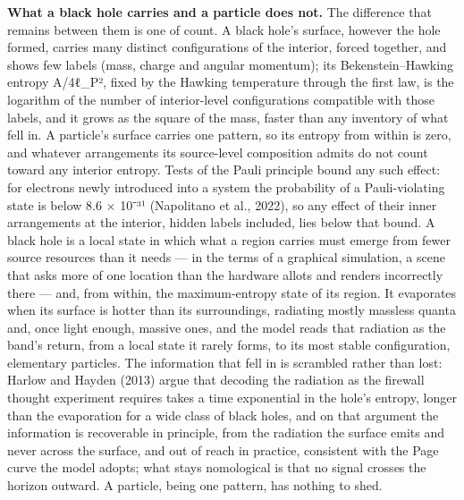 \documentclass[
]{article}
\begin{document}
\textbf{What a black hole carries and a particle does not.} The
difference that remains between them is one of count. A black hole's
surface, however the hole formed, carries many distinct configurations
of the interior, forced together, and shows few labels (mass, charge and
angular momentum); its Bekenstein--Hawking entropy A/4ℓ\_P², fixed by
the Hawking temperature through the first law, is the logarithm of the
number of interior-level configurations compatible with those labels,
and it grows as the square of the mass, faster than any inventory of
what fell in. A particle's surface carries one pattern, so its entropy
from within is zero, and whatever arrangements its source-level
composition admits do not count toward any interior entropy. Tests of
the Pauli principle bound any such effect: for electrons newly
introduced into a system the probability of a Pauli-violating state is
below 8.6 × 10⁻³¹ (Napolitano et al., 2022), so any effect of their
inner arrangements at the interior, hidden labels included, lies below
that bound. A black hole is a local state in which what a region carries
must emerge from fewer source resources than it needs --- in the terms
of a graphical simulation, a scene that asks more of one location than
the hardware allots and renders incorrectly there --- and, from within,
the maximum-entropy state of its region. It evaporates when its surface
is hotter than its surroundings, radiating mostly massless quanta and,
once light enough, massive ones, and the model reads that radiation as
the band's return, from a local state it rarely forms, to its most
stable configuration, elementary particles. The information that fell in
is scrambled rather than lost: Harlow and Hayden (2013) argue that
decoding the radiation as the firewall thought experiment requires takes
a time exponential in the hole's entropy, longer than the evaporation
for a wide class of black holes, and on that argument the information is
recoverable in principle, from the radiation the surface emits and never
across the surface, and out of reach in practice, consistent with the
Page curve the model adopts; what stays nomological is that no signal
crosses the horizon outward. A particle, being one pattern, has nothing
to shed.
\end{document}
